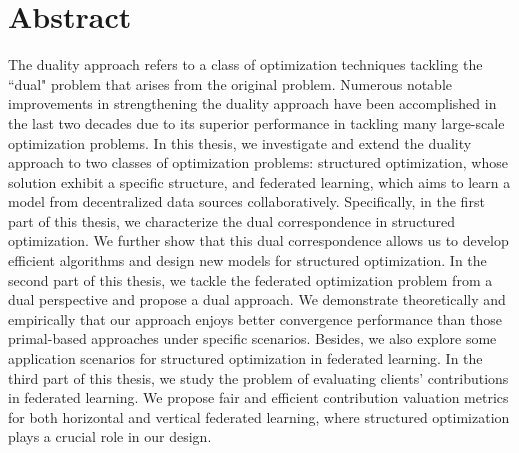 
\chapter{Abstract}

The duality approach refers to a class of optimization techniques tackling the ``dual" problem that arises from the original problem. Numerous notable improvements in strengthening the duality approach have been accomplished in the last two decades due to its superior performance in tackling many large-scale optimization problems. In this thesis, we investigate and extend the duality approach to two classes of optimization problems: structured optimization, whose solution exhibit a specific structure, and federated learning, which aims to learn a model from decentralized data sources collaboratively. Specifically, in the first part of this thesis, we characterize the dual correspondence in structured optimization. We further show that this dual correspondence allows us to develop efficient algorithms and design new models for structured optimization. In the second part of this thesis, we tackle the federated optimization problem from a dual perspective and propose a dual approach. We demonstrate theoretically and empirically that our approach enjoys better convergence performance than those primal-based approaches under specific scenarios. Besides, we also explore some application scenarios for structured optimization in federated learning. In the third part of this thesis, we study the problem of evaluating clients' contributions in federated learning. We propose fair and efficient contribution valuation metrics for both horizontal and vertical federated learning, where structured optimization plays a crucial role in our design. 









